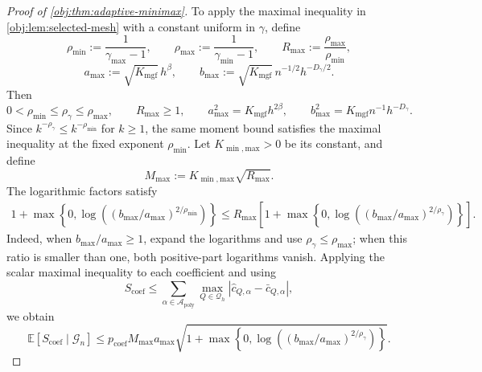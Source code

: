 \begin{proof}[Proof of \cref{obj:thm:adaptive-minimax}]
To apply the maximal inequality in \cref{obj:lem:selected-mesh} with a constant uniform in \(\gamma\), define
\[
\rho_{\min}:=\frac1{\gamma_{\max}-1},
\qquad
\rho_{\max}:=\frac1{\gamma_{\min}-1},
\qquad
R_{\mathrm{max}}:=\frac{\rho_{\max}}{\rho_{\min}},
\]
\[
a_{\mathrm{max}}:=\sqrt{K_{\mathrm{mgf}}}\,h^\beta,
\qquad
b_{\mathrm{max}}:=\sqrt{K_{\mathrm{mgf}}}\,n^{-1/2}h^{-D_\gamma/2}.
\]
Then
\[
0<\rho_{\min}\le\rho_\gamma\le\rho_{\max},
\qquad R_{\mathrm{max}}\ge1,
\qquad
 a_{\mathrm{max}}^2=K_{\mathrm{mgf}}h^{2\beta},
\qquad
 b_{\mathrm{max}}^2=K_{\mathrm{mgf}}n^{-1}h^{-D_\gamma}.
\]
Since \(k^{-\rho_\gamma}\le k^{-\rho_{\min}}\) for \(k\ge1\), the same moment bound satisfies the maximal inequality at the fixed exponent \(\rho_{\min}\). Let \(K_{\min,\mathrm{max}}>0\) be its constant, and define
\[
M_{\mathrm{max}}:=K_{\min,\mathrm{max}}\sqrt{R_{\mathrm{max}}}.
\]
The logarithmic factors satisfy
\[
\begin{aligned}
1+\max\left\{0,\log\left(
 (b_{\mathrm{max}}/a_{\mathrm{max}})^{2/\rho_{\min}}
\right)\right\}
\le R_{\mathrm{max}}\left[
1+\max\left\{0,\log\left(
 (b_{\mathrm{max}}/a_{\mathrm{max}})^{2/\rho_\gamma}
\right)\right\}\right].
\end{aligned}
\]
Indeed, when \(b_{\mathrm{max}}/a_{\mathrm{max}}\ge1\), expand the logarithms and use \(\rho_\gamma\le\rho_{\max}\); when this ratio is smaller than one, both positive-part logarithms vanish. Applying the scalar maximal inequality to each coefficient and using
\[
S_{\mathrm{coef}}
\le\sum_{\alpha\in\mathcal A_{\mathrm{poly}}}
\max_{Q\in\mathcal Q_h}
|\widehat c_{Q,\alpha}-\bar c_{Q,\alpha}|,
\]
we obtain
\[
\mathbb E[S_{\mathrm{coef}}\mid\mathcal G_n]
\le p_{\mathrm{coef}}M_{\mathrm{max}}a_{\mathrm{max}}
\sqrt{1+\max\left\{0,\log\left(
(b_{\mathrm{max}}/a_{\mathrm{max}})^{2/\rho_\gamma}
\right)\right\}}.
\]


\end{proof}
